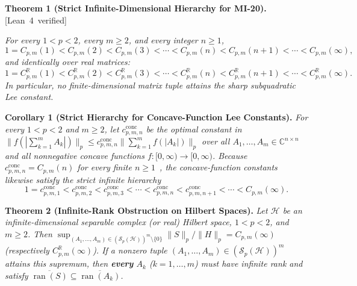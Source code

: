 \documentclass[10pt,letterpaper]{article}
\newcommand{\leanbadge}[1]{\mbox{\sffamily\scriptsize\color{leanborder}[#1]}}
\newcommand{\C}{\mathbb{C}}
\newcommand{\R}{\mathbb{R}}
\newcommand{\Hilb}{\mathcal{H}}
\newcommand{\Sp}{\mathcal{S}_p}
\newcommand{\ran}{\operatorname{ran}}
\newcommand{\conc}{\mathrm{conc}}
\begin{document}
\begin{tcolorbox}[mathbox]
\textbf{Theorem 1 (Strict Infinite-Dimensional Hierarchy for MI-20).}\hfill\leanbadge{Lean~4 verified}\par\vspace{1.5pt}
\emph{For every $1 < p < 2$, every $m \ge 2$, and every integer $n \ge 1$,}
\[
  1 = C_{p,m}(1) < C_{p,m}(2) < C_{p,m}(3) < \cdots < C_{p,m}(n) < C_{p,m}(n+1) < \cdots < C_{p,m}(\infty),
\]
\emph{and identically over real matrices:}
\[
  1 = C_{p,m}^{\R}(1) < C_{p,m}^{\R}(2) < C_{p,m}^{\R}(3) < \cdots < C_{p,m}^{\R}(n) < C_{p,m}^{\R}(n+1) < \cdots < C_{p,m}^{\R}(\infty).
\]
\emph{In particular, no finite-dimensional matrix tuple attains the sharp subquadratic Lee constant.}
\end{tcolorbox}

\begin{tcolorbox}[lemmabox]
\textbf{Corollary 1 (Strict Hierarchy for Concave-Function Lee Constants).}
\emph{For every $1 < p < 2$ and $m \ge 2$, let $c_{p,m,n}^{\conc}$ be the optimal constant in $\|f(|\sum_{k=1}^m A_k|)\|_p \le c_{p,m,n}^{\conc} \|\sum_{k=1}^m f(|A_k|)\|_p$ over all $A_1,\dots,A_m \in \C^{n\times n}$ and all nonnegative concave functions $f : [0,\infty) \to [0,\infty)$. Because $c_{p,m,n}^{\conc} = C_{p,m}(n)$ for every finite $n \ge 1$~\cite[Theorem~1.1]{Li2026}, the concave-function constants likewise satisfy the strict infinite hierarchy}
\[
  1 = c_{p,m,1}^{\conc} < c_{p,m,2}^{\conc} < c_{p,m,3}^{\conc} < \cdots < c_{p,m,n}^{\conc} < c_{p,m,n+1}^{\conc} < \cdots < C_{p,m}(\infty).
\]
\end{tcolorbox}

\begin{tcolorbox}[mathbox]
\textbf{Theorem 2 (Infinite-Rank Obstruction on Hilbert Spaces).}
\emph{Let $\Hilb$ be an infinite-dimensional separable complex (or real) Hilbert space, $1 < p < 2$, and $m \ge 2$. Then $\sup_{(A_1,\dots,A_m)\in(\Sp(\Hilb))^m\setminus\{0\}} \|S\|_p / \|H\|_p = C_{p,m}(\infty)$ (respectively $C_{p,m}^{\R}(\infty)$). If a nonzero tuple $(A_1,\dots,A_m) \in (\Sp(\Hilb))^m$ attains this supremum, then \textbf{every} $A_k$ ($k = 1,\dots,m$) must have infinite rank and satisfy $\overline{\ran(S)} \subseteq \overline{\ran(A_k)}$.}
\end{tcolorbox}
\end{document}
